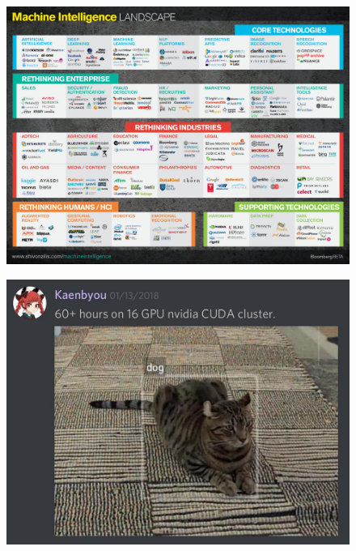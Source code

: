 \documentclass[10pt, compress]{beamer}
\begin{document}
\begin{frame}
  \vspace{.6cm}
    \begin{figure}
      \includegraphics[width=1\linewidth]{imgs/ml_landscape}
    \end{figure}
\end{frame}

\begin{frame}
  \vspace{.6cm}
  \begin{figure}
    \includegraphics[width=.9\linewidth]{imgs/funny_1}
  \end{figure}
\end{frame}
\end{document}
